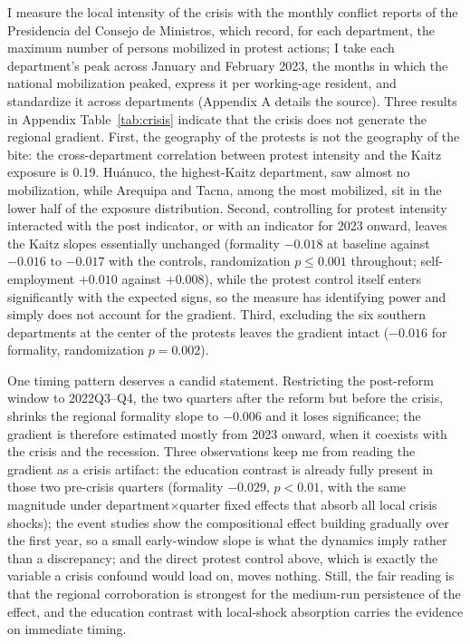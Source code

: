 I measure the local intensity of the crisis with the monthly conflict reports of the Presidencia del Consejo de Ministros, which record, for each department, the maximum number of persons mobilized in protest actions; I take each department's peak across January and February 2023, the months in which the national mobilization peaked, express it per working-age resident, and standardize it across departments (Appendix A details the source). Three results in Appendix Table~\ref{tab:crisis} indicate that the crisis does not generate the regional gradient. First, the geography of the protests is not the geography of the bite: the cross-department correlation between protest intensity and the Kaitz exposure is 0.19. Hu\'anuco, the highest-Kaitz department, saw almost no mobilization, while Arequipa and Tacna, among the most mobilized, sit in the lower half of the exposure distribution. Second, controlling for protest intensity interacted with the post indicator, or with an indicator for 2023 onward, leaves the Kaitz slopes essentially unchanged (formality $-0.018$ at baseline against $-0.016$ to $-0.017$ with the controls, randomization $p \le 0.001$ throughout; self-employment $+0.010$ against $+0.008$), while the protest control itself enters significantly with the expected signs, so the measure has identifying power and simply does not account for the gradient. Third, excluding the six southern departments at the center of the protests leaves the gradient intact ($-0.016$ for formality, randomization $p = 0.002$).

One timing pattern deserves a candid statement. Restricting the post-reform window to 2022Q3--Q4, the two quarters after the reform but before the crisis, shrinks the regional formality slope to $-0.006$ and it loses significance; the gradient is therefore estimated mostly from 2023 onward, when it coexists with the crisis and the recession. Three observations keep me from reading the gradient as a crisis artifact: the education contrast is already fully present in those two pre-crisis quarters (formality $-0.029$, $p<0.01$, with the same magnitude under department$\times$quarter fixed effects that absorb all local crisis shocks); the event studies show the compositional effect building gradually over the first year, so a small early-window slope is what the dynamics imply rather than a discrepancy; and the direct protest control above, which is exactly the variable a crisis confound would load on, moves nothing. Still, the fair reading is that the regional corroboration is strongest for the medium-run persistence of the effect, and the education contrast with local-shock absorption carries the evidence on immediate timing.

